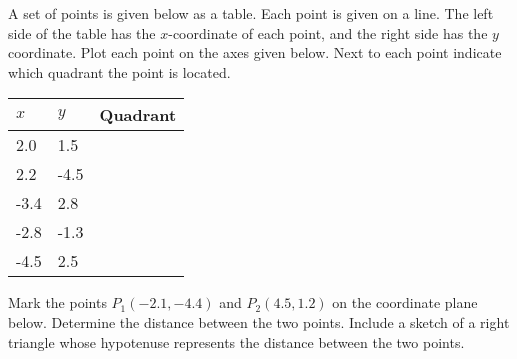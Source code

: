 \begin{problem}
\item A set of points is given below as a table. Each point is given
  on a line. The left side of the table has the $x$-coordinate of each
  point, and the right side has the $y$ coordinate. Plot each point on
  the axes given below. Next to each point indicate which quadrant the
  point is located.

  \begin{tabular}{l|ll}
    $x$ & $y$ & Quadrant \\ \hline
     2.0 &  1.5 & \\ [10pt]
     2.2 & -4.5 & \\ [10pt]
    -3.4 &  2.8 & \\ [10pt]
    -2.8 & -1.3 & \\ [10pt]
    -4.5 &  2.5 & \\ [10pt]
  \end{tabular}


  \vfill

  \clearpage

\item Mark the points $P_1(-2.1,-4.4)$ and $P_2(4.5,1.2)$ on the coordinate plane
  below. Determine the distance between the two points.  Include a
  sketch of a right triangle whose hypotenuse represents the distance
  between the two points.


\end{problem}
